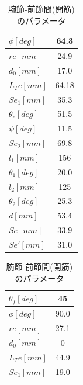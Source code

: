 \begin{table}[htbp]
\begin{minipage}{0.5\hsize}
\begin{tabular}{|l|c|}
    $\phi[deg]     $ & 64.3                         \\ \hline
    $re[mm]        $ & 24.9                         \\ \hline
    $d_0[mm]       $ & 17.0                         \\ \hline
    $L_Te[mm]      $ & 64.18                        \\ \hline
    $Se_1[mm]      $ & 35.3                         \\ \hline
    $\theta_e[deg] $ & 51.5                         \\ \hline
    $\psi[deg]     $ & 11.5                         \\ \hline
    $Se_2[mm]      $ & 69.8                         \\ \hline
    $l_1[mm]       $ & 156                          \\ \hline
    $\theta_1[deg] $ & 20.0                         \\ \hline
    $l_2[mm]       $ & 125                          \\ \hline
    $\theta_2[deg] $ & 25.3                         \\ \hline
    $d[mm]         $ & 53.4                         \\ \hline
    $Se[mm]        $ & 33.9                         \\ \hline
    $Se'[mm]       $ & 31.0                         \\ \hline
    \end{tabular}
  \end{minipage}
  \begin{minipage}{0.5\hsize}
    \centering
    \vspace{5mm}
    \caption{腕節-前節間(開筋)のパラメータ}
    \label{tab:parameta_2_1}
    \vspace{-3mm}
    \begin{tabular}{|l|c|}
    \hline
    $\theta_f[deg] $ & 45                           \\ \hline
    $\phi[deg]     $ & 90.0                         \\ \hline
    $re[mm]        $ & 27.1                         \\ \hline
    $d_0[mm]       $ & 0                            \\ \hline
    $L_Te[mm]      $ & 44.9                         \\ \hline
    $Se_1[mm]      $ & 19.0                         \\ \hline

\end{tabular}
\end{minipage}
\end{table}
